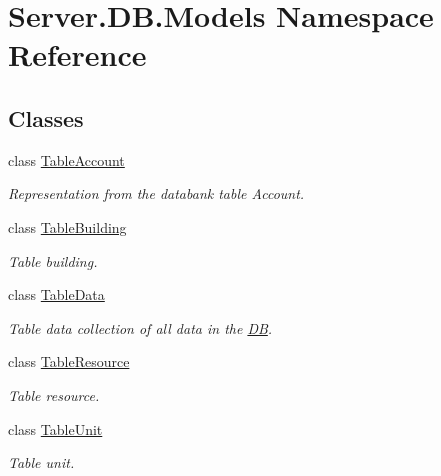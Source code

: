 \hypertarget{namespaceServer_1_1DB_1_1Models}{}\section{Server.\+D\+B.\+Models Namespace Reference}
\label{namespaceServer_1_1DB_1_1Models}
\subsection*{Classes}
\begin{DoxyCompactItemize}
\item 
class \hyperlink{classServer_1_1DB_1_1Models_1_1TableAccount}{Table\+Account}
\begin{DoxyCompactList}\small\item\em Representation from the databank table Account. \end{DoxyCompactList}\item 
class \hyperlink{classServer_1_1DB_1_1Models_1_1TableBuilding}{Table\+Building}
\begin{DoxyCompactList}\small\item\em Table building. \end{DoxyCompactList}\item 
class \hyperlink{classServer_1_1DB_1_1Models_1_1TableData}{Table\+Data}
\begin{DoxyCompactList}\small\item\em Table data collection of all data in the \hyperlink{namespaceServer_1_1DB}{D\+B}. \end{DoxyCompactList}\item 
class \hyperlink{classServer_1_1DB_1_1Models_1_1TableResource}{Table\+Resource}
\begin{DoxyCompactList}\small\item\em Table resource. \end{DoxyCompactList}\item 
class \hyperlink{classServer_1_1DB_1_1Models_1_1TableUnit}{Table\+Unit}
\begin{DoxyCompactList}\small\item\em Table unit. \end{DoxyCompactList}\end{DoxyCompactItemize}
